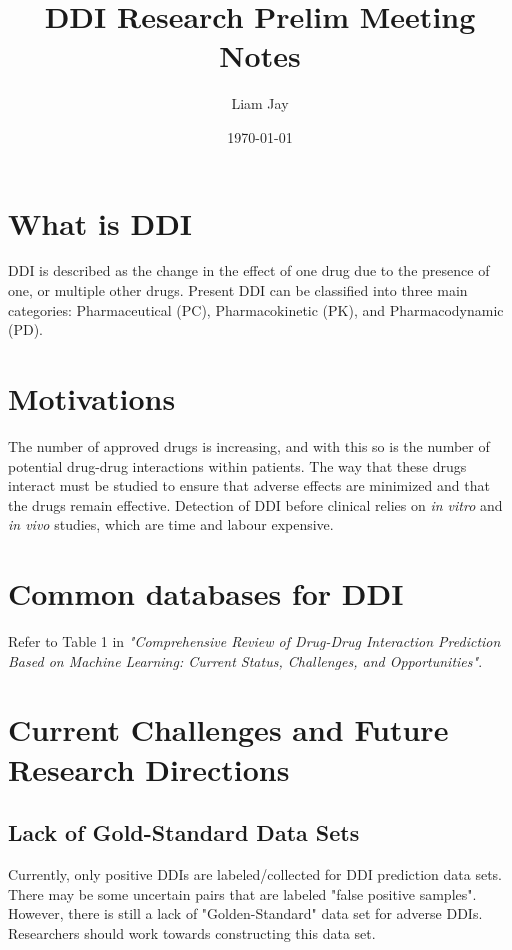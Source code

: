 \documentclass[11pt,a4paper]{article}
\title{DDI Research Prelim Meeting Notes}
\author{Liam Jay}
\date{\today}
\begin{document}
\maketitle


\section{What is DDI}
DDI is described as the change in the effect of one drug due to the presence of one, or multiple other drugs. Present DDI can be classified into three main categories: Pharmaceutical (PC), Pharmacokinetic (PK), and Pharmacodynamic (PD).

\section{Motivations}
The number of approved drugs is increasing, and with this so is the number of potential drug-drug interactions within patients. The way that these drugs interact must be studied to ensure that adverse effects are minimized and that the drugs remain effective.
Detection of DDI before clinical relies on \textit{in vitro} and \textit{in vivo} studies, which are time and labour expensive.

\section{Common databases for DDI}
Refer to Table 1 in \textit{"Comprehensive Review of Drug-Drug Interaction Prediction Based
on Machine Learning: Current Status, Challenges, and Opportunities"}.





\section{Current Challenges and Future Research Directions}

\subsection{Lack of Gold-Standard Data Sets}
Currently, only positive DDIs are labeled/collected for DDI prediction data sets. There may be some uncertain pairs that are labeled "false positive samples". However, there is still a lack of "Golden-Standard" data set for adverse DDIs. Researchers should work towards constructing this data set.
\end{document}
